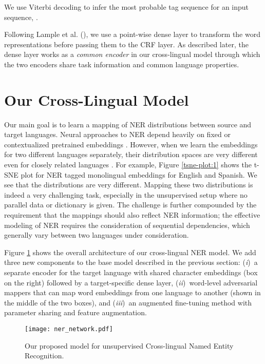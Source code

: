 \documentclass[letterpaper]{article} \usepackage{aaai20}  \usepackage{times}  \usepackage{helvet} \usepackage{courier}  \usepackage[hyphens]{url}  \usepackage{graphicx} \urlstyle{rm} \def\UrlFont{\rm}  \usepackage{graphicx}  \frenchspacing  \setlength{\pdfpagewidth}{8.5in}  \setlength{\pdfpageheight}{11in}
\newcommand{\Ni}{({\em i})~}
\newcommand{\Nii}{({\em ii})~}
\newcommand{\Niii}{({\em iii})~}
\begin{document}
\normalsize
\noindent We use Viterbi decoding to infer the most probable tag sequence for an input sequence,   
. 

Following Lample et al. (\citeyear{lampleNER}), we use a point-wise dense layer to transform the word representations before passing them to the CRF layer. As described later, the dense layer works as a \emph{common encoder} in our cross-lingual model through which the two encoders share task information and common language properties.   




\section{Our Cross-Lingual Model}





{Our main goal is to learn a mapping of NER distributions between source and target languages.} Neural approaches to NER depend heavily on fixed or contextualized pretrained  embeddings \cite{ELMO,BERT,akbik2018coling}. However, when we learn the embeddings for two different languages separately, their distribution spaces are very different even for closely related languages \cite{Anders-18}. For example, Figure \ref{tsne-plot:1} shows the t-SNE plot for NER tagged monolingual embeddings for English and Spanish. We see that the distributions are very different. Mapping these two distributions is indeed a very challenging task, especially in the unsupervised setup where no parallel data or dictionary is given. The challenge is further compounded by the requirement that the mappings should also reflect NER information; the effective modeling of NER requires the consideration of sequential dependencies, which generally vary between two languages under consideration.

Figure \ref{fig:model} shows the overall architecture of our cross-lingual NER model. We add {three new components} to the base model described in the previous section: \Ni a separate encoder for the target language with shared character embeddings (box on the right) followed by a target-specific dense layer, \Nii word-level adversarial mappers that can map word embeddings from one language to another (shown in the middle of the two boxes), and \Niii an augmented fine-tuning method with parameter sharing and feature augmentation. 

\begin{figure}[t!]
    \centering
    \texttt{[image: ner\_network.pdf]}
    \caption{Our proposed model for unsupervised Cross-lingual Named Entity Recognition.}
    \label{fig:model}
\end{figure}
\end{document}
